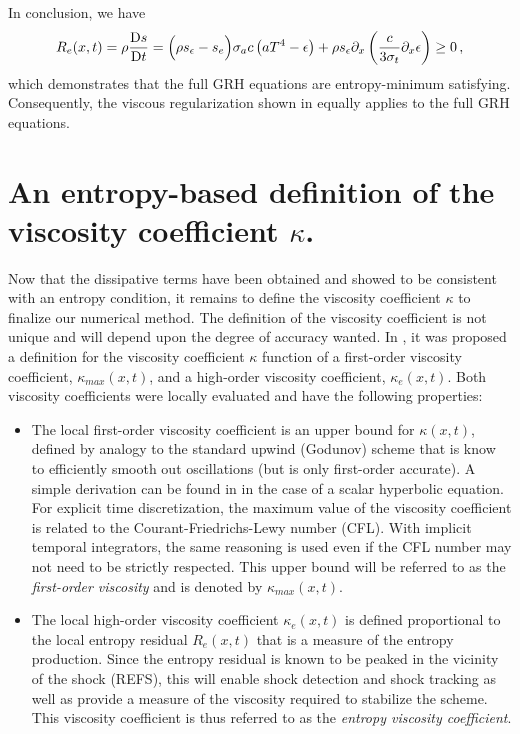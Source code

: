 \documentclass[review]{elsarticle}
\begin{document}
In conclusion, we have 
\begin{equation} 
R_e(x,t) = \rho \frac{\textrm{D} s}{\textrm{D} t} = \Big( \rho s_\epsilon -s_e \Big)  \sigma_a c \left( a T^4 - \epsilon \right) +   \rho s_\epsilon \partial_x \left( \frac{c}{3 \sigma_t} \partial_x \epsilon \right) \geq 0 \,,
\end{equation}
which demonstrates that the full GRH equations are entropy-minimum satisfying. Consequently, the viscous regularization shown in  equally applies to the full GRH equations. 
%
\section{An entropy-based definition of the viscosity coefficient $\kappa$.}\label{sec:def-visc-coeff}
%
Now that the dissipative terms have been obtained and showed to be consistent with an entropy condition, it remains to define the viscosity coefficient $\kappa$ to finalize our numerical method. The definition of the viscosity coefficient is not unique and will depend upon the degree of accuracy wanted. In \cite{our_jcp_radhy_paper}, it was proposed a definition for the viscosity coefficient $\kappa$ function of a first-order viscosity coefficient, $\kappa_{max}(x,t)$, and a high-order viscosity coefficient, $\kappa_e(x,t)$. Both viscosity coefficients were locally evaluated and have the following properties:
\begin{itemize}
\item The local first-order viscosity coefficient is an upper bound for $\kappa(x,t)$, defined by analogy to the standard upwind (Godunov) scheme that is know to efficiently smooth out oscillations (but is only first-order accurate). A simple derivation can be found in \cite{jlg1} in the case of a scalar hyperbolic equation. For explicit time discretization, the maximum value of the viscosity coefficient is related to the Courant-Friedrichs-Lewy number (CFL). With implicit temporal integrators, the same reasoning is used even if the CFL number may not need to be strictly respected. This upper bound will be referred to as the \emph{first-order viscosity} and is denoted by $\kappa_{max}(x,t)$.  
\item The local high-order viscosity coefficient $\kappa_e(x,t)$ is defined proportional to the local entropy residual $R_e(x,t)$ that is a measure of the entropy production. Since the entropy residual is known to be peaked in the vicinity of the shock (REFS), this will enable shock detection and shock tracking as well as provide a measure of the viscosity required to stabilize the scheme. This viscosity coefficient is thus referred to as the \emph{entropy viscosity coefficient}.
\end{itemize}
\end{document}
